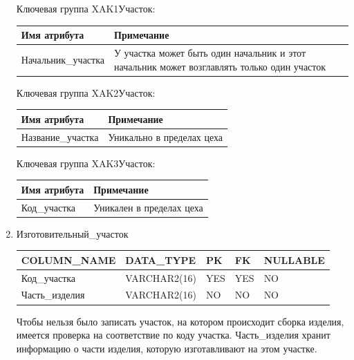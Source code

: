 \begin{enumerate}
\begin{tabular}{|p{7cm}|p{9.3cm}|}
    \end{tabular}

    Ключевая группа XAK1Участок:

    \begin{tabular}{|p{7cm}|p{9.3cm}|} \hline

        {\bf Имя атрибута} & {\bf Примечание} \\ \hline
        Начальник\_участка & У участка может быть один начальник и этот начальник может возглавлять только один участок \\ \hline

    \end{tabular}

    Ключевая группа XAK2Участок:

    \begin{tabular}{|p{7cm}|p{9.3cm}|} \hline

        {\bf Имя атрибута} & {\bf Примечание} \\ \hline
        Название\_участка & Уникально в пределах цеха \\ \hline

    \end{tabular}

    Ключевая группа XAK3Участок:

    \begin{tabular}{|p{7cm}|p{9.3cm}|} \hline

        {\bf Имя атрибута} & {\bf Примечание} \\ \hline
        Код\_участка & Уникален в пределах цеха \\ \hline

    \end{tabular}

    \item{Изготовительный\_участок}

    \begin{tabular}{|p{7cm}|p{3cm}|p{1cm}|p{1cm}|p{3cm}|} \hline

        {\bf COLUMN\_NAME} & {\bf DATA\_TYPE} & {\bf PK} & {\bf FK} & {\bf NULLABLE} \\ \hline
        Код\_участка & VARCHAR2(16) & YES & YES & NO \\ \hline
        Часть\_изделия & VARCHAR2(16) & NO & NO & NO \\ \hline

    \end{tabular}

    Чтобы нельзя было записать участок, на котором происходит сборка изделия, имеется проверка на соответствие по коду участка.
    Часть\_изделия хранит информацию о части изделия, которую изготавливают на этом участке.


\end{enumerate}
